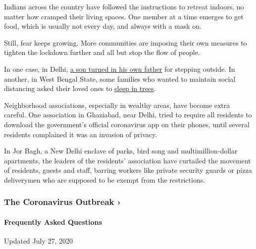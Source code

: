 Indians across the country have followed the instructions to retreat
indoors, no matter how cramped their living spaces. One member at a time
emerges to get food, which is usually not every day, and always with a
mask on.

Still, fear keeps growing. More communities are imposing their own
measures to tighten the lockdown further and all but stop the flow of
people.

In one case, in Delhi,
\href{https://www.deccanherald.com/national/father-always-out-roaming-during-lockdown-son-calls-police-820942.html}{a
son turned in his own father} for stepping outside. In another, in West
Bengal State, some families who wanted to maintain social distancing
asked their loved ones to
\href{https://www.theweek.in/news/india/2020/03/29/returning-labourers-in-bengal-village-made-to-stay-in-tree-houses.html}{sleep
in trees}.

Neighborhood associations, especially in wealthy areas, have become
extra careful. One association in Ghaziabad, near Delhi, tried to
require all residents to download the government's official coronavirus
app on their phones, until several residents complained it was an
invasion of privacy.

In Jor Bagh, a New Delhi enclave of parks, bird song and
multimillion-dollar apartments, the leaders of the residents'
association have curtailed the movement of residents, guests and staff,
barring workers like private security guards or pizza deliverymen who
are supposed to be exempt from the restrictions.

\href{https://www.nytimes.com/news-event/coronavirus?action=click\&pgtype=Article\&state=default\&region=MAIN_CONTENT_3\&context=storylines_faq}{}

\hypertarget{the-coronavirus-outbreak-}{%
\subsubsection{The Coronavirus Outbreak
›}\label{the-coronavirus-outbreak-}}

\hypertarget{frequently-asked-questions}{%
\paragraph{Frequently Asked
Questions}\label{frequently-asked-questions}}

Updated July 27, 2020

